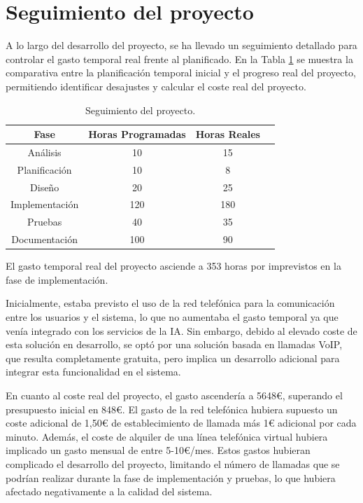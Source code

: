 \section{Seguimiento del proyecto}
    A lo largo del desarrollo del proyecto, se ha llevado un seguimiento detallado para controlar el gasto temporal real frente al planificado. 
    En la Tabla \ref{tab:3.3} se muestra la comparativa entre la planificación temporal inicial y el progreso real del proyecto, permitiendo identificar desajustes y calcular el coste real del proyecto.
    \begin{table}[H]
        \centering
        \begin{tabular}{|c c c | c|}
            \hline
            \textbf{Fase} & \textbf{Horas Programadas} & \textbf{Horas Reales} \\ \hline
            Análisis & 10 & 15 \\
            Planificación & 10 & 8 \\
            Diseño & 20 & 25 \\
            Implementación & 120 & 180 \\
            Pruebas & 40 & 35 \\
            Documentación & 100 & 90\\
            \hline
        \end{tabular}
        \caption{Seguimiento del proyecto.}
        \label{tab:3.3}
    \end{table}
    El gasto temporal real del proyecto asciende a 353 horas por imprevistos en la fase de implementación. 
    
    Inicialmente, estaba previsto el uso de la red telefónica para la comunicación entre los usuarios y el sistema, lo que no aumentaba el gasto temporal ya que venía integrado con los servicios de la IA.
    Sin embargo, debido al elevado coste de esta solución en desarrollo, se optó por una solución basada en llamadas VoIP, que resulta completamente gratuita, pero implica un desarrollo adicional para integrar esta funcionalidad en el sistema.

    En cuanto al coste real del proyecto, el gasto ascendería a 5648€, superando el presupuesto inicial en 848€. 
    El gasto de la red telefónica hubiera supuesto un coste adicional de 1,50€ de establecimiento de llamada más 1€ adicional por cada minuto. 
    Además, el coste de alquiler de una línea telefónica virtual hubiera implicado un gasto mensual de entre 5-10€/mes. 
    Estos gastos hubieran complicado el desarrollo del proyecto, limitando el número de llamadas que se podrían realizar durante la fase de implementación y pruebas, lo que hubiera afectado negativamente a la calidad del sistema.